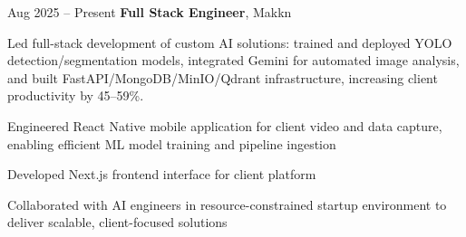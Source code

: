 \begin{twocolentry}{
            Aug 2025 – Present
        }
\textbf{Full Stack Engineer}, Makkn\end{twocolentry}

\vspace{0.10 cm}
\begin{onecolentry}
    \begin{highlights}
        \item Led full-stack development of custom AI solutions: trained and deployed YOLO detection/segmentation models, integrated Gemini for automated image analysis, and built FastAPI/MongoDB/MinIO/Qdrant infrastructure, increasing client productivity by 45--59\%.
        \item Engineered React Native mobile application for client video and data capture, enabling efficient ML model training and pipeline ingestion
        \item Developed Next.js frontend interface for client platform
        \item Collaborated with AI engineers in resource-constrained startup environment to deliver scalable, client-focused solutions
    \end{highlights}
\end{onecolentry}